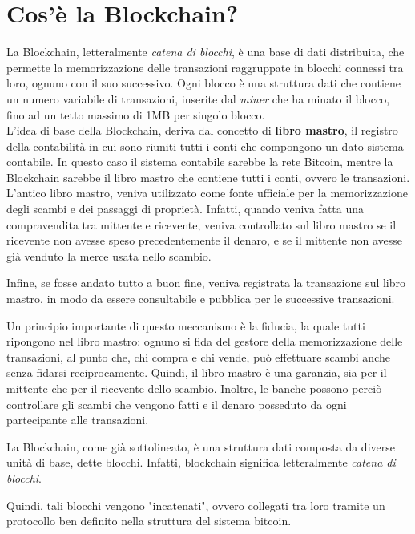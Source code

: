 \section{Cos'è la Blockchain?}
La Blockchain, letteralmente \textit{catena di blocchi}, è una base di dati distribuita, che permette la memorizzazione delle transazioni raggruppate in blocchi connessi tra loro, ognuno con il suo successivo. Ogni blocco è una struttura dati che contiene un numero variabile di transazioni, inserite dal \textit{miner} che ha minato il blocco, fino ad un tetto massimo di 1MB per singolo blocco.\\

L'idea di base della Blockchain, deriva dal concetto di \textbf{libro mastro}, il registro della contabilità in cui sono riuniti tutti i conti che compongono un dato sistema contabile. In questo caso il sistema contabile sarebbe la rete Bitcoin, mentre la Blockchain sarebbe il libro mastro che contiene tutti i conti, ovvero le transazioni. \\

L'antico libro mastro, veniva utilizzato come fonte ufficiale per la memorizzazione degli scambi e dei passaggi di proprietà. Infatti, quando veniva fatta una compravendita tra mittente e ricevente, veniva controllato sul libro mastro se il ricevente non avesse speso precedentemente il denaro, e se il mittente non avesse già venduto la merce usata nello scambio.

Infine, se fosse andato tutto a buon fine, veniva registrata la transazione sul libro mastro, in modo da essere consultabile e pubblica per le successive transazioni.

Un principio importante di questo meccanismo è la fiducia, la quale tutti ripongono nel libro mastro: ognuno si fida del gestore della memorizzazione delle transazioni, al punto che, chi compra e chi vende, può effettuare scambi anche senza fidarsi reciprocamente. Quindi, il libro mastro è una garanzia, sia per il mittente che per il ricevente dello scambio. Inoltre, le banche possono perciò controllare gli scambi che vengono fatti e il denaro posseduto da ogni partecipante alle transazioni.

La Blockchain, come già sottolineato, è una struttura dati composta da diverse unità di base, dette blocchi. Infatti, blockchain significa letteralmente \textit{catena di blocchi}.

Quindi, tali blocchi vengono "incatenati", ovvero collegati tra loro tramite un protocollo ben definito nella struttura del sistema bitcoin. 

